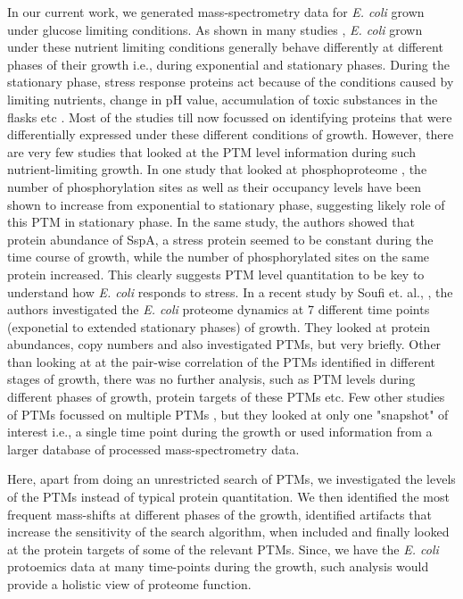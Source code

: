 \documentclass[12pt]{article}
\begin{document}
In our current work, we generated mass-spectrometry data for \emph{E. coli} grown under glucose limiting conditions. As shown in many studies \cite{Soaresetal2013}\cite{Soufietal2015}, \emph{E. coli} grown under these nutrient limiting conditions generally behave differently at different phases of their growth i.e., during exponential and stationary phases. During the stationary phase, stress response proteins act because of the conditions caused by limiting nutrients, change in pH value, accumulation of toxic substances in the flasks etc \cite{Nystrom2004}. Most of the studies till now focussed on identifying proteins that were differentially expressed under these different conditions of growth. However, there are very few studies that looked at the PTM level information during such nutrient-limiting growth. In one study that looked at phosphoproteome \cite{Soaresetal2013}, the number of phosphorylation sites as well as their occupancy levels have been shown to increase from exponential to stationary phase, suggesting likely role of this PTM in stationary phase. In the same study, the authors showed that protein abundance of SspA, a stress protein seemed to be constant during the time course of growth, while the number of phosphorylated sites on the same protein increased. This clearly suggests PTM level quantitation to be key to understand how \emph{E. coli} responds to stress. In a recent study by Soufi et. al., \cite{Soufietal2015}, the authors investigated the \emph{E. coli} proteome dynamics at 7 different time points (exponetial to extended stationary phases) of growth. They looked at protein abundances, copy numbers and also investigated PTMs, but very briefly. Other than looking at at the pair-wise correlation of the PTMs identified in different stages of growth, there was no further analysis, such as PTM levels during different phases of growth, protein targets of these PTMs etc. Few other studies of PTMs focussed on multiple PTMs \cite{Guptaetal2007}, but they looked at only one "snapshot" of interest i.e., a single time point during the growth or used information from a larger database of processed mass-spectrometry data.

Here, apart from doing an unrestricted search of PTMs, we investigated the levels of the PTMs instead of typical protein quantitation. We then identified the most frequent mass-shifts at different phases of the growth, identified artifacts that increase the sensitivity of the search algorithm, when included and finally looked at the protein targets of some of the relevant PTMs. Since, we have the \emph{E. coli} protoemics data at many time-points during the growth, such analysis would provide a holistic view of proteome function. 
\end{document}
